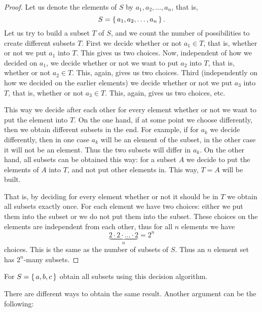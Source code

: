 \begin{proof}
Let us denote the elements of $S$ by $a_1, a_2, \dots , a_n$, 
that is, 
\[
S = \left\{\,a_1, a_2, \dots , a_n\,\right\}. 
\]
Let us try to build a subset $T$ of $S$, 
and we count the number of possibilities to create different subsets $T$. 
First we decide whether or not $a_1 \in T$, 
that is, whether or not we put $a_1$ into $T$. 
This gives us two choices. 
Now, independent of how we decided on $a_1$, 
we decide whether or not we want to put $a_2$ into $T$, 
that is, whether or not $a_2 \in T$. 
This, again, gives us two choices. 
Third (independently on how we decided on the earlier elements)
we decide whether or not we put $a_3$ into $T$, 
that is, whether or not $a_3 \in T$. 
This, again, gives us two choices, etc. 

This way we decide after each other for every element whether or not we want to put the element into $T$. 
On the one hand, 
if at some point we choose differently, then we obtain different subsets in the end. 
For example, if for $a_k$ we decide differently, 
then in one case $a_k$ will be an element of the subset, 
in the other case it will not be an element. 
Thus the two subsets will differ in $a_k$. 
On the other hand, 
all subsets can be obtained this way: 
for a subset $A$ we decide to put the elements of $A$ into $T$, 
and not put other elements in. 
This way, $T=A$ will be built. 

That is, by deciding for every element whether or not it should be in $T$ we obtain all subsets exactly once. 
For each element we have two choices: 
either we put them into the subset or we do not put them into the subset. 
These choices on the elements are independent from each other, 
thus for all $n$ elements we have 
\[
\underbrace{2 \cdot 2 \cdot \dots \cdot 2}_{n} = 2^n
\]
choices. 
This is the same as the number of subsets of $S$. 
Thus an $n$ element set has $2^n$-many subsets. 
\end{proof}

\begin{exercise}\label{ex:subsettrytheproof}
For $S= \left\{\,a, b, c\,\right\}$ obtain all subsets using this decision algorithm. 
\end{exercise}

There are different ways to obtain the same result. 
Another argument can be the following:

